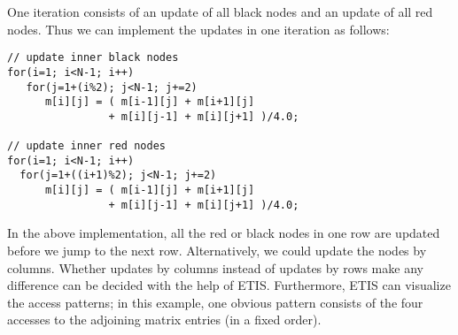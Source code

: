 One iteration consists of an update of all black nodes and an update of all red nodes. Thus we can implement the updates in one iteration as follows:
\begin{lstlisting}
// update inner black nodes
for(i=1; i<N-1; i++)
   for(j=1+(i%2); j<N-1; j+=2)
      m[i][j] = ( m[i-1][j] + m[i+1][j] 
                + m[i][j-1] + m[i][j+1] )/4.0;

// update inner red nodes
for(i=1; i<N-1; i++)
  for(j=1+((i+1)%2); j<N-1; j+=2)
      m[i][j] = ( m[i-1][j] + m[i+1][j] 
                + m[i][j-1] + m[i][j+1] )/4.0;
\end{lstlisting}
In the above implementation, all the red or black nodes in one row are updated before we jump to the next row. Alternatively, we could update the nodes by columns. Whether updates by columns instead of updates by rows make any difference can be decided with the help of ETIS. Furthermore, ETIS can visualize the access patterns; in this example, one obvious pattern consists of the four accesses to the adjoining matrix entries (in a fixed order).

